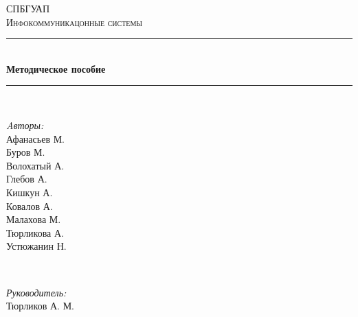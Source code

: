 
	\begin{titlepage}
		
		\newcommand{\HRule}{\rule{\linewidth}{0.5mm}} %
		
		\center %
		
		
		\textsc{\LARGE СПБГУАП}\\[1.5cm] %
		\textsc{\Large Инфокоммуникацонные системы}\\[0.5cm] %
		
		
		\HRule \\[0.4cm]
		{ \huge \bfseries Методическое пособие}\\[0.4cm] %
		\HRule \\[1.5cm]
		
		
		\begin{minipage}{0.4\textwidth}
			\begin{flushleft} \large
				\emph{Aвторы:}\\
				Афанасьев	М.\\
				Буров	М.\\
				Волохатый	А.\\
				Глебов	А.\\
				Кишкун	А.\\
				Ковалов	А.\\
				Малахова	М.\\
				Тюрликова	А.\\
				Устюжанин	Н.\\
			\end{flushleft}
		\end{minipage}
		~
		\begin{minipage}{0.4\textwidth}
			\begin{flushright} \large
				\emph{Руководитель:} \\
				Тюрликов А. М.
			\end{flushright}
		\end{minipage}\\[4cm]
		

\end{titlepage}
